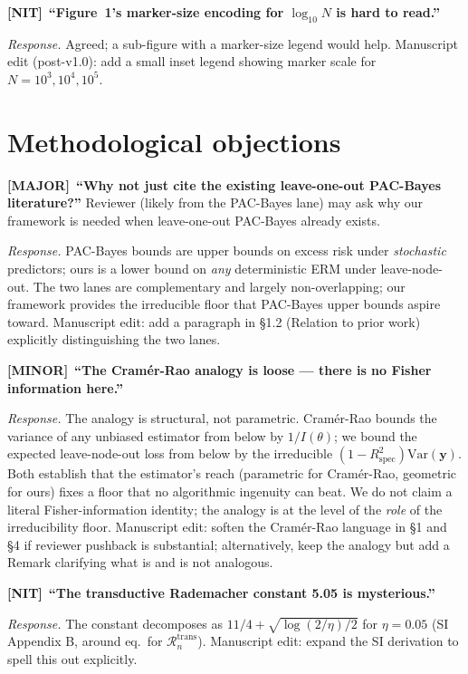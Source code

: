 \documentclass[11pt,a4paper]{article}
\theoremstyle{plain}
\newcommand{\by}{\mathbf{y}}
\newcommand{\Var}{\mathrm{Var}}
\newcommand{\Rspec}{R^2_{\mathrm{spec}}}
\newcommand{\Rcal}{\mathcal{R}}
\newcommand{\Major}{\textcolor{majorobj}{\textbf{[MAJOR]}}\ }
\newcommand{\Minor}{\textcolor{minorobj}{\textbf{[MINOR]}}\ }
\newcommand{\Nit}{\textcolor{nitobj}{\textbf{[NIT]}}\ }
\begin{document}
\smallskip
\Nit \textbf{``Figure~1's marker-size encoding for $\log_{10} N$ is
hard to read.''}

\emph{Response.}  Agreed; a sub-figure with a marker-size legend would
help.  Manuscript edit (post-v1.0): add a small inset legend showing
marker scale for $N = 10^3, 10^4, 10^5$.

\section{Methodological objections}

\Major \textbf{``Why not just cite the existing leave-one-out PAC-Bayes
literature?''}  Reviewer (likely from the PAC-Bayes lane) may ask
why our framework is needed when leave-one-out PAC-Bayes
\citep{LangfordCaruana2002,DziugaiteRoy2017} already exists.

\emph{Response.}  PAC-Bayes bounds are upper bounds on excess risk
under \emph{stochastic} predictors; ours is a lower bound on \emph{any}
deterministic ERM under leave-node-out.  The two lanes are complementary
and largely non-overlapping; our framework provides the irreducible
floor that PAC-Bayes upper bounds aspire toward.  Manuscript edit: add
a paragraph in §1.2 (Relation to prior work) explicitly distinguishing
the two lanes.

\smallskip
\Minor \textbf{``The Cramér-Rao analogy is loose --- there is no Fisher
information here.''}

\emph{Response.}  The analogy is structural, not parametric.  Cramér-Rao
bounds the variance of any unbiased estimator from below by
$1/I(\theta)$; we bound the expected leave-node-out loss from below by
the irreducible $(1 - \Rspec) \Var(\by)$.  Both establish that the
estimator's reach (parametric for Cramér-Rao, geometric for ours)
fixes a floor that no algorithmic ingenuity can beat.  We do not
claim a literal Fisher-information identity; the analogy is at the
level of the \emph{role} of the irreducibility floor.  Manuscript edit:
soften the Cramér-Rao language in §1 and §4 if reviewer pushback is
substantial; alternatively, keep the analogy but add a Remark
clarifying what is and is not analogous.

\smallskip
\Nit \textbf{``The transductive Rademacher constant 5.05 is mysterious.''}

\emph{Response.}  The constant decomposes as $11/4 + \sqrt{\log(2/\eta)/2}$
for $\eta = 0.05$ (SI Appendix B, around eq.\ for
$\Rcal^{\mathrm{trans}}_n$).  Manuscript edit: expand the SI
derivation to spell this out explicitly.
\end{document}
